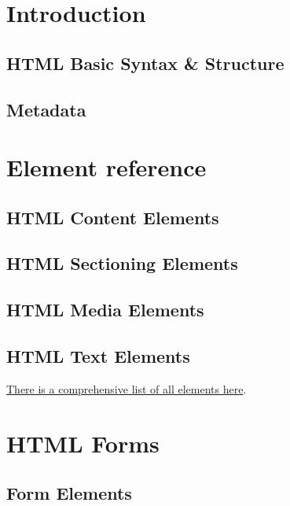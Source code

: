 \documentclass[b5paper,openany]{book}
\begin{document}
\tp


\tableofcontents



\chapter{Introduction}

\section{HTML Basic Syntax \& Structure}


\section{Metadata}
%


\chapter{Element reference}

\section{HTML Content Elements}


\section{HTML Sectioning Elements}


\section{HTML Media Elements}
%

\section{HTML Text Elements}
%

\href{https://developer.mozilla.org/en-US/docs/Web/HTML/Element}{There is a comprehensive list of all elements here}.


\chapter{HTML Forms}

\section{Form Elements}
%




\end{document}
